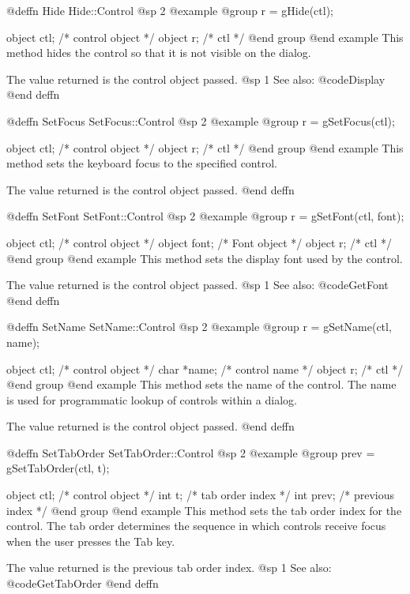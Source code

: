 @deffn {Hide} Hide::Control
@sp 2
@example
@group
r = gHide(ctl);

object  ctl;   /*  control object  */
object  r;     /*  ctl             */
@end group
@end example
This method hides the control so that it is not visible on the dialog.

The value returned is the control object passed.
@sp 1
See also:  @code{Display}
@end deffn



@deffn {SetFocus} SetFocus::Control
@sp 2
@example
@group
r = gSetFocus(ctl);

object  ctl;   /*  control object  */
object  r;     /*  ctl             */
@end group
@end example
This method sets the keyboard focus to the specified control.

The value returned is the control object passed.
@end deffn



@deffn {SetFont} SetFont::Control
@sp 2
@example
@group
r = gSetFont(ctl, font);

object  ctl;    /*  control object  */
object  font;   /*  Font object     */
object  r;      /*  ctl             */
@end group
@end example
This method sets the display font used by the control.

The value returned is the control object passed.
@sp 1
See also:  @code{GetFont}
@end deffn



@deffn {SetName} SetName::Control
@sp 2
@example
@group
r = gSetName(ctl, name);

object  ctl;    /*  control object   */
char    *name;  /*  control name     */
object  r;      /*  ctl              */
@end group
@end example
This method sets the name of the control.  The name is used for
programmatic lookup of controls within a dialog.

The value returned is the control object passed.
@end deffn



@deffn {SetTabOrder} SetTabOrder::Control
@sp 2
@example
@group
prev = gSetTabOrder(ctl, t);

object  ctl;    /*  control object     */
int     t;      /*  tab order index    */
int     prev;   /*  previous index     */
@end group
@end example
This method sets the tab order index for the control.  The tab order
determines the sequence in which controls receive focus when the user
presses the Tab key.

The value returned is the previous tab order index.
@sp 1
See also:  @code{GetTabOrder}
@end deffn




